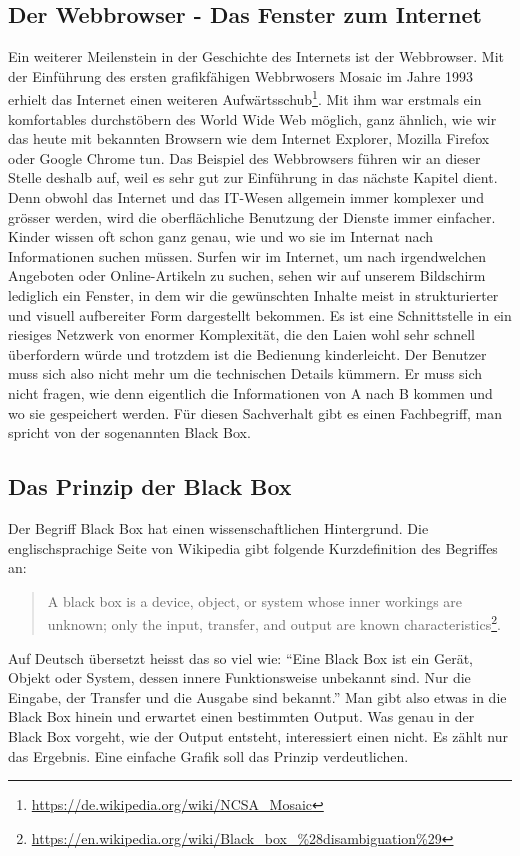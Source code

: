 \subsection{Der Webbrowser - Das Fenster zum Internet}
Ein weiterer Meilenstein in der Geschichte des Internets ist der Webbrowser. Mit der Einführung des ersten grafikfähigen Webbrwosers Mosaic im Jahre 1993 erhielt das Internet einen weiteren Aufwärtsschub\footnote{\url{https://de.wikipedia.org/wiki/NCSA_Mosaic}}. Mit ihm war erstmals ein komfortables durchstöbern des World Wide Web möglich, ganz ähnlich, wie wir das heute mit bekannten Browsern wie dem Internet Explorer, Mozilla Firefox oder Google Chrome tun. Das Beispiel des Webbrowsers führen wir an dieser Stelle deshalb auf, weil es sehr gut zur Einführung in das nächste Kapitel dient.
Denn obwohl das Internet und das IT-Wesen allgemein immer komplexer und grösser werden, wird die oberflächliche Benutzung der Dienste immer einfacher. Kinder wissen oft schon ganz genau, wie und wo sie im Internat nach Informationen suchen müssen. Surfen wir im Internet, um nach irgendwelchen Angeboten oder Online-Artikeln zu suchen, sehen wir auf unserem Bildschirm lediglich ein Fenster, in dem wir die gewünschten Inhalte meist in strukturierter und visuell aufbereiter Form dargestellt bekommen. Es ist eine Schnittstelle in ein riesiges Netzwerk von enormer Komplexität, die den Laien wohl sehr schnell überfordern würde und trotzdem ist die Bedienung kinderleicht. Der Benutzer muss sich also nicht mehr um die technischen Details kümmern. Er muss sich nicht fragen, wie denn eigentlich die Informationen von A nach B kommen und wo sie gespeichert werden. Für diesen Sachverhalt gibt es einen Fachbegriff, man spricht von der sogenannten Black Box.

\subsection{Das Prinzip der Black Box}
Der Begriff Black Box hat einen wissenschaftlichen Hintergrund. Die englischsprachige Seite von Wikipedia gibt folgende Kurzdefinition des Begriffes an: 

\begin{quote} 
A black box is a device, object, or system whose inner workings are unknown; only the input, transfer, and output are known characteristics\footnote{\url{https://en.wikipedia.org/wiki/Black_box_\%28disambiguation\%29}}.
\end{quote}

Auf Deutsch übersetzt heisst das so viel wie: ``Eine Black Box ist ein Gerät, Objekt oder System, dessen innere Funktionsweise unbekannt sind. Nur die Eingabe, der Transfer und die Ausgabe sind bekannt.''
Man gibt also etwas in die Black Box hinein und erwartet einen bestimmten Output. Was genau in der Black Box vorgeht, wie der Output entsteht, interessiert einen nicht. Es zählt nur das Ergebnis. Eine einfache Grafik soll das Prinzip verdeutlichen. 


